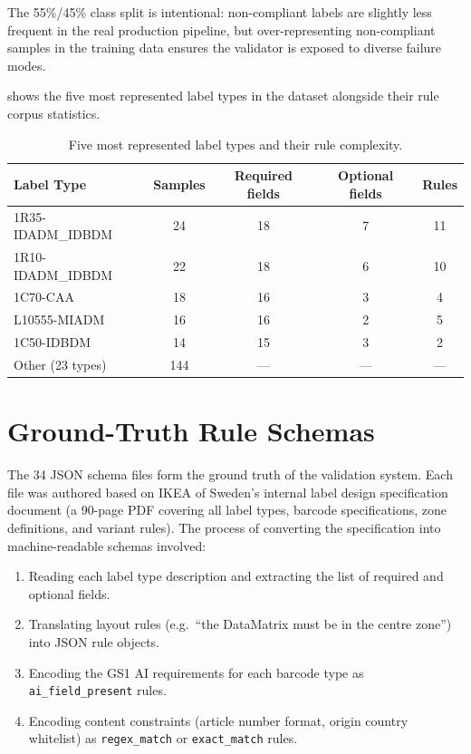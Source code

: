 The 55\%/45\% class split is intentional: non-compliant labels are slightly less frequent in
the real production pipeline, but over-representing non-compliant samples in the training
data ensures the validator is exposed to diverse failure modes.

 shows the five most represented label types in the dataset
alongside their rule corpus statistics.

\begin{table}[h]
\centering
\caption{Five most represented label types and their rule complexity.}
\label{tab:label_type_distribution}
\begin{tabular}{lcccc}
\toprule
\textbf{Label Type} & \textbf{Samples} & \textbf{Required fields} & \textbf{Optional fields} & \textbf{Rules} \\
\midrule
1R35-IDADM\_IDBDM & 24 & 18 & 7  & 11 \\
1R10-IDADM\_IDBDM & 22 & 18 & 6  & 10 \\
1C70-CAA          & 18 & 16 & 3  & 4  \\
L10555-MIADM      & 16 & 16 & 2  & 5  \\
1C50-IDBDM        & 14 & 15 & 3  & 2  \\
\midrule
Other (23 types)  & 144 & --- & --- & --- \\
\bottomrule
\end{tabular}
\end{table}

\section{Ground-Truth Rule Schemas}

The 34 JSON schema files form the ground truth of the validation system. Each file was
authored based on IKEA of Sweden's internal label design specification document (a
90-page PDF covering all label types, barcode specifications, zone definitions, and
variant rules). The process of converting the specification into machine-readable schemas
involved:

\begin{enumerate}
  \item Reading each label type description and extracting the list of required and optional
  fields.
  \item Translating layout rules (e.g.\ ``the DataMatrix must be in the centre zone'') into
  JSON rule objects.
  \item Encoding the GS1 AI requirements for each barcode type as \texttt{ai\_field\_present}
  rules.
  \item Encoding content constraints (article number format, origin country whitelist) as
  \texttt{regex\_match} or \texttt{exact\_match} rules.
\end{enumerate}

